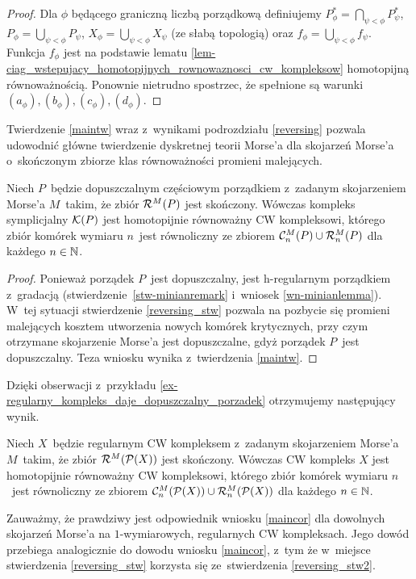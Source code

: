 \begin{proof}
Dla $\phi$ będącego graniczną liczbą porządkową definiujemy $P^*_\phi=\bigcap_{\psi<\phi}P^*_\psi$, $P_\phi=\bigcup_{\psi<\phi}P_\psi$, $X_\phi=\bigcup_{\psi<\phi}X_\psi$ (ze słabą topologią) oraz $f_\phi=\bigcup_{\psi<\phi} f_\psi$. Funkcja $f_\phi$ jest na podstawie lematu \ref{lem-ciag_wstepujacy_homotopijnych_rownowaznosci_cw_kompleksow} homotopijną równoważnością. Ponownie nietrudno spostrzec, że spełnione są warunki $(a_\phi), (b_\phi), (c_\phi), (d_\phi)$.
\end{proof}

Twierdzenie \ref{maintw} wraz z~wynikami podrozdziału \ref{reversing} pozwala udowodnić główne twierdzenie dyskretnej teorii Morse'a dla skojarzeń Morse'a o~skończonym zbiorze klas równoważności promieni malejących.

\begin{wn}\label{maincor}
Niech $P$~będzie dopuszczalnym częściowym porządkiem z~zadanym skojarzeniem Morse'a $M$~takim, że zbiór $\mathcal{R}^M(P)$ jest skończony. Wówczas kompleks symplicjalny $\mathcal{K}(P)$ jest homotopijnie równoważny CW kompleksowi, którego zbiór komórek wymiaru $n$~jest równoliczny ze zbiorem $\mathcal{C}_n^M(P)\cup \mathcal{R}_n^M(P)$ dla każdego $n\in\mathbb{N}$.
\end{wn}
\begin{proof}
Ponieważ porządek $P$~jest dopuszczalny, jest h-regularnym porządkiem z~gradacją (stwierdzenie~\ref{stw-minianremark} i~wniosek \ref{wn-minianlemma}). W~tej sytuacji stwierdzenie \ref{reversing_stw} pozwala na pozbycie się promieni malejących kosztem utworzenia nowych komórek krytycznych, przy czym otrzymane skojarzenie Morse'a jest dopuszczalne, gdyż porządek $P$~jest dopuszczalny. Teza wniosku wynika z~twierdzenia \ref{maintw}.
\end{proof}

Dzięki obserwacji z~przykładu \ref{ex-regularny_kompleks_daje_dopuszczalny_porzadek} otrzymujemy następujący wynik.

\begin{wn}\label{maincor2}
Niech $X$~będzie regularnym CW kompleksem z~zadanym skojarzeniem Morse'a $M$~takim, że zbiór $\mathcal{R}^M(\mathcal{P}(X))$ jest skończony. Wówczas CW kompleks $X$ jest homotopijnie równoważny CW kompleksowi, którego zbiór komórek wymiaru $n$~jest równoliczny ze zbiorem $\mathcal{C}_n^M(\mathcal{P}(X))\cup \mathcal{R}_n^M(\mathcal{P}(X))$ dla każdego $n\in\mathbb{N}$.
\end{wn}

Zauważmy, że prawdziwy jest odpowiednik wniosku \ref{maincor} dla dowolnych skojarzeń Morse'a na $1$-wymiarowych, regularnych CW kompleksach. Jego dowód przebiega analogicznie do dowodu wniosku \ref{maincor}, z~tym że w~miejsce stwierdzenia \ref{reversing_stw} korzysta się ze~stwierdzenia \ref{reversing_stw2}.

